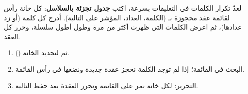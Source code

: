 \begin{statement}
لعدّ تكرار الكلمات في التعليقات بسرعة، اكتب \textbf{جدول تجزئة بالسلاسل}: كل خانة رأس لقائمة عقد محجوزة بـ  (الكلمة، العداد، المؤشر على التالية). أدرج كل كلمة (أو زد عدادها)، ثم اعرض الكلمات التي ظهرت أكثر من مرة وطول أطول سلسلة، وحرر كل العقد.
\end{statement}
\begin{stepsbox}\begin{enumerate}
\item {} () ثم  لتحديد الخانة.
\item البحث في القائمة؛ إذا لم توجد الكلمة نحجز عقدة جديدة ونضعها في رأس القائمة.
\item التحرير: لكل خانة نمر على القائمة ونحرر العقدة بعد حفظ التالية.
\end{enumerate}\end{stepsbox}
